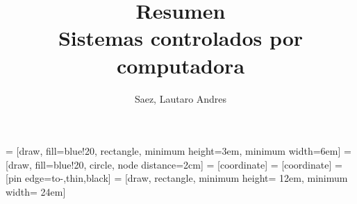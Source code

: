 \documentclass{book}
\title{Resumen \\ Sistemas controlados por computadora}
\author{Saez, Lautaro Andres}
\date{}
\begin{document}
    \maketitle
  

     = [draw, fill=blue!20, rectangle, 
    minimum height=3em, minimum width=6em]
     = [draw, fill=blue!20, circle, node distance=2cm]
     = [coordinate]
     = [coordinate]
     = [pin edge={to-,thin,black}]
     = [draw, rectangle, minimum height= 12em, minimum width= 24em]

    
    
    
    
    
\end{document}
